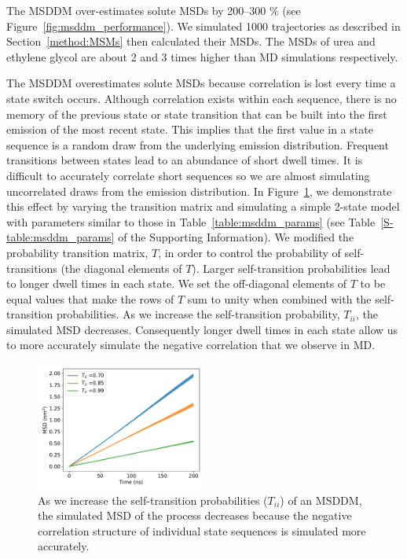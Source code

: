 \documentclass{article}
\begin{document}
  The MSDDM over-estimates solute MSDs by 200--300 \% (see Figure~\ref{fig:msddm_performance}). 
  We simulated 1000 trajectories as described in Section~\ref{method:MSMs} then
  calculated their MSDs. The MSDs of urea and ethylene glycol are about 2 and 3 times
  higher than MD simulations respectively.
 
  The MSDDM overestimates solute MSDs because correlation is lost
  every time a state switch occurs. Although correlation exists within each
  sequence, there is no memory of the previous state or state transition 
  that can be built into the first emission of the most recent state. 
  This implies that the first value in a state sequence is a random
  draw from the underlying emission distribution. Frequent transitions
  between states lead to an abundance of short dwell times. It is 
  difficult to accurately correlate short sequences so we are 
  almost simulating uncorrelated draws from the emission distribution.
  In Figure~\ref{fig:T_sensitivity}, we demonstrate this effect by varying 
  the transition matrix and simulating a simple 2-state model with parameters
  similar to those in Table~\ref{table:msddm_params} (see Table~\ref{S-table:msddm_params}
  of the Supporting Information). We modified the probability
  transition matrix, $T$, in order to control the probability of 
  self-transitions (the diagonal elements of $T$). Larger self-transition probabilities lead to longer dwell 
  times in each state. We set the off-diagonal elements of $T$ to be equal values that make the
  rows of $T$ sum to unity when combined with the self-transition probabilities. 
  As we increase the self-transition probability, $T_{ii}$, the simulated MSD 
  decreases. Consequently longer dwell times in each state allow us to more accurately
  simulate the negative correlation that we observe in MD.
  
  \begin{figure}
  \centering
  \includegraphics[width=0.5\textwidth]{T_sensitivity.pdf}
  \caption{As we increase the self-transition probabilities ($T_{ii}$) of an MSDDM,
  the simulated MSD of the process decreases because the negative correlation structure
  of individual state sequences is simulated more accurately.}\label{fig:T_sensitivity}
  \end{figure}
  
\end{document}
